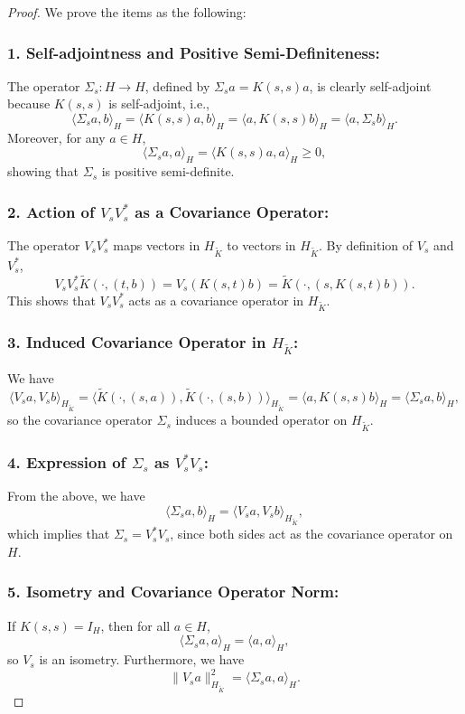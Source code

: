 \documentclass[10pt,a4paper]{amsart}
\begin{document}
\begin{proof}
We prove the items as the following:
\subsubsection*{1. Self-adjointness and Positive Semi-Definiteness:} The operator \( \Sigma_s: H \to H \), defined by \( \Sigma_s a = K(s,s)a \), is clearly self-adjoint because \( K(s,s) \) is self-adjoint, i.e.,
    \[
    \langle \Sigma_s a, b \rangle_H = \langle K(s,s)a, b \rangle_H = \langle a, K(s,s)b \rangle_H = \langle a, \Sigma_s b \rangle_H.
    \]
    Moreover, for any \( a \in H \),
    \[
    \langle \Sigma_s a, a \rangle_H = \langle K(s,s) a, a \rangle_H \geq 0,
    \]
    showing that \( \Sigma_s \) is positive semi-definite.
    
\subsubsection*{2. Action of \( V_s V_s^* \) as a Covariance Operator:} The operator \( V_s V_s^* \) maps vectors in \( H_{\tilde{K}} \) to vectors in \( H_{\tilde{K}} \). By definition of \( V_s \) and \( V_s^* \),
    \[
    V_s V_s^* \tilde{K}(\cdot, (t, b)) = V_s (K(s, t) b) = \tilde{K}(\cdot, (s, K(s,t) b)).
    \]
    This shows that \( V_s V_s^* \) acts as a covariance operator in \( H_{\tilde{K}} \).
    
\subsubsection*{3. Induced Covariance Operator in \( H_{\tilde{K}} \):} We have
    \[
    \langle V_s a, V_s b \rangle_{H_{\tilde{K}}} = \langle \tilde{K}(\cdot, (s, a)), \tilde{K}(\cdot, (s, b)) \rangle_{H_{\tilde{K}}} = \langle a, K(s,s) b \rangle_H = \langle \Sigma_s a, b \rangle_H,
    \]
    so the covariance operator \( \Sigma_s \) induces a bounded operator on \( H_{\tilde{K}} \).
    
\subsubsection*{4. Expression of \( \Sigma_s \) as \( V_s^* V_s \):} From the above, we have
    \[
    \langle \Sigma_s a, b \rangle_H = \langle V_s a, V_s b \rangle_{H_{\tilde{K}}},
    \]
    which implies that \( \Sigma_s = V_s^* V_s \), since both sides act as the covariance operator on \( H \).
    
\subsubsection*{5. Isometry and Covariance Operator Norm:} If \( K(s,s) = I_H \), then for all \( a \in H \),
    \[
    \langle \Sigma_s a, a \rangle_H = \langle a, a \rangle_H,
    \]
    so \( V_s \) is an isometry. Furthermore, we have
    \[
    \| V_s a \|_{H_{\tilde{K}}}^2 = \langle \Sigma_s a, a \rangle_H.
    \]

\end{proof}
\end{document}
